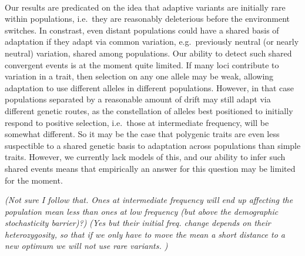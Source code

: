 \documentclass{article}
\newcommand{\gc}[1]{{\it\color{green}(#1)} }
\newcommand{\plr}[1]{{\it\color{blue}(#1)}}
\begin{document}
\paragraph{}
Our results are predicated on the idea that adaptive variants are
initially rare within populations, i.e.\ they are reasonably
deleterious before the environment switches. In constrast, even distant populations could have
a shared basis of adaptation if they adapt via common variation,
e.g.\ previously neutral (or nearly neutral) variation, shared among populations. 
Our ability to detect such shared convergent events is at the moment quite limited. 
If many loci contribute to variation in a trait, then
selection on any one allele may be weak, allowing adaptation to use different alleles in different populations.
However, in that case populations separated by a reasonable amount of drift may still
adapt via different genetic routes, as the constellation of alleles
best positioned to initially respond to positive selection, 
i.e.\ those at intermediate frequency, will be somewhat different. 
So it may be the case that polygenic traits are even less suspectible to a shared
genetic basis to adaptation across populations than simple traits.   
However, we currently lack models of this, and our ability to infer
such shared events means that empirically an answer for this question
may be limited for the moment.

\plr{Not sure I follow that.  Ones at intermediate frequency will end up affecting the population mean less
than ones at low frequency (but above the demographic stochasticity barrier)?}
\gc{Yes but their initial freq. change depends on their
  heterozygosity, so that if we only have to move the mean a short
  distance to a new optimum we will not use rare variants. }

\end{document}

